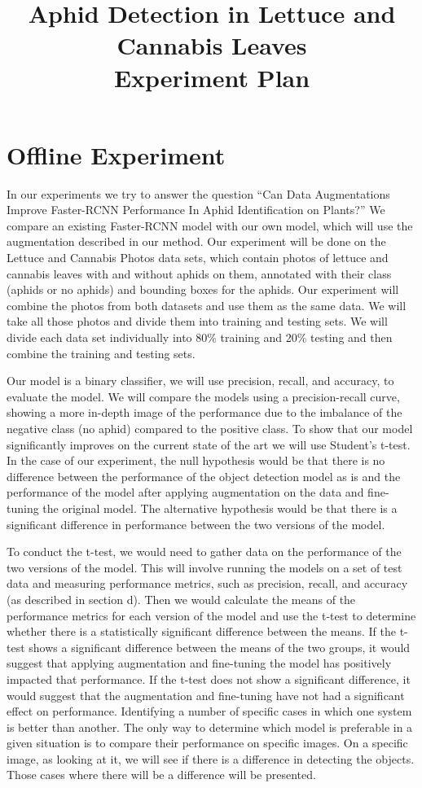 \documentclass{article}
\title{Aphid Detection in Lettuce and Cannabis Leaves \\ Experiment Plan}
\begin{document}
\maketitle

\section{Offline Experiment}
In our experiments we try to answer the question “Can Data Augmentations Improve Faster-RCNN Performance In Aphid Identification on Plants?”
We compare an existing Faster-RCNN model with our own model, which will use the augmentation described in our method.
Our experiment will be done on the Lettuce and Cannabis Photos data sets, which contain photos of lettuce and cannabis leaves with and without aphids on them, 
annotated with their class (aphids or no aphids) and bounding boxes for the aphids.
Our experiment will combine the photos from both datasets and use them as the same data. 
We will take all those photos and divide them into training and testing sets. We will divide each data set individually into 80\% 
training and 20\% testing and then combine the training and testing sets.


Our model is a binary classifier, we will use precision, recall, and accuracy, to evaluate the model. We will compare the models using a precision-recall curve,
showing a more in-depth image of the performance due to the imbalance of the negative class (no aphid) compared to the positive class.
To show that our model significantly improves on the current state of the art we will use Student’s t-test. 
In the case of our experiment, the null hypothesis would be that there is no difference between the performance of the object 
detection model as is and the performance of the model after applying augmentation on the data and fine-tuning the original model. 
The alternative hypothesis would be that there is a significant difference in performance between the two versions of the model.


To conduct the t-test, we would need to gather data on the performance of the two versions of the model. This will involve running the 
models on a set of test data and measuring performance metrics, such as precision, recall, and accuracy 
(as described in section d). Then we would calculate the means of the performance metrics for each version of the 
model and use the t-test to determine whether there is a statistically significant difference between the means.
If the t-test shows a significant difference between the means of the two groups, it would suggest that applying 
augmentation and fine-tuning the model has positively impacted that performance. If the t-test does not show a 
significant difference, it would suggest that the augmentation and fine-tuning have not had a significant effect on performance.
Identifying a number of specific cases in which one system is better than another.
The only way to determine which model is preferable in a given situation is to compare their performance on specific images.
On a specific image, as looking at it, we will see if there is a difference in detecting the objects. Those cases where there will be a difference will be presented.
\end{document}
